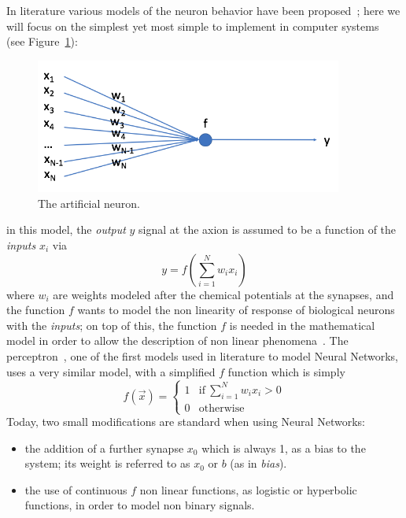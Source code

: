  In literature various models of the neuron behavior have been proposed~\cite{neuronbe1, neuronbe2}; 
 here we will focus on the simplest yet most simple to implement in computer systems~\cite{artificialneuron} (see Figure~\ref{fig:artificialneuron}): %
 \begin{figure}[h]
    \centering
    \hfill
        \includegraphics[width=0.9\textwidth]{images/artificialneuron.png}
     \caption{The artificial neuron.}
     \label{fig:artificialneuron}

\end{figure}
 in this model, the \emph{output} $y$ signal at the axion is assumed to be a function of the \emph{inputs} $x_i$ via
 \begin{equation}
   y = f\left(\sum_{i=1}^{N} w_i x_i\right)
   \label{eq:artificialneuron}
 \end{equation}
where $w_i$ are weights modeled after the chemical potentials at the synapses, and the function $f$ wants to model the non linearity of response of biological neurons with the \emph{inputs}; on top of this, the function $f$ is needed in the mathematical model in order to allow the description of non linear phenomena~\cite{nonlinearitytheorem}. The perceptron~\cite{perceptron}, one of the first models used in literature to model Neural Networks, uses a very similar model, with a simplified $f$ function which is simply
\begin{equation}
  f(\vec{x})= \begin{cases}
                1 &  \text{if}\  \sum_{i=1}^{N} w_i x_i >0 \\
                0 &  \text{otherwise}
              \end{cases}
\end{equation}
Today, two small modifications are standard when using Neural Networks:
\begin{itemize}
\item the addition of a further synapse $x_0$ which is always 1, as a bias to the system; its weight is referred to as $x_0$ or $b$ (as in \emph{bias}).
\item the use of continuous $f$ non linear functions, as  logistic or hyperbolic~\cite{logistic} functions, in order to model non binary signals.
\end{itemize}
